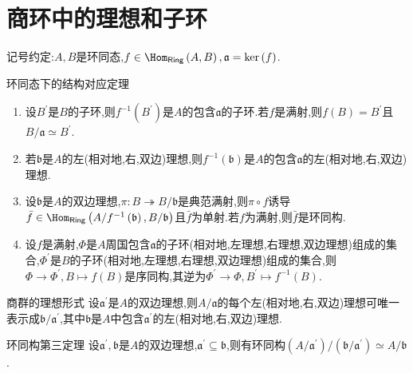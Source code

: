 \section{商环中的理想和子环}

记号约定:$A,B$是环同态,$f\in\Hom_{\mathsf{Ring}}\left(A,B\right),\mathfrak{a}=\ker\left(f\right)$.

\begin{proposition}{环同态下的结构对应定理}{}
	\begin{enumerate}
		\item 设$B^{\prime}$是$B$的子环,则$f^{-1}\left(B^{\prime}\right)$是$A$的包含$\mathfrak{a}$的子环.若$f$是满射,则$f\left(B\right)=B^{\prime}$且$B/\mathfrak{a}\simeq B^{\prime}$.
		\item 若$\mathfrak{b}$是$A$的左(相对地,右,双边)理想,则$f^{-1}\left(\mathfrak{b}\right)$是$A$的包含$\mathfrak{a}$的左(相对地,右,双边)理想.
		\item 设$\mathfrak{b}$是$A$的双边理想,$\pi:B\twoheadrightarrow B/\mathfrak{b}$是典范满射,则$\pi\circ f$诱导$\bar{f}\in\Hom_{\mathsf{Ring}}\left(A/f^{-1}\left(\mathfrak{b}\right),B/\mathfrak{b}\right)$且$\bar{f}$为单射.若$f$为满射,则$\bar{f}$是环同构.
		\item 设$f$是满射,$\Phi$是$A$周国包含$\mathfrak{a}$的子环(相对地,左理想,右理想,双边理想)组成的集合,$\Phi^{\prime}$是$B$的子环(相对地,左理想,右理想,双边理想)组成的集合,则$\Phi\to\Phi^{\prime},B\mapsto f\left(B\right)$是序同构,其逆为$\Phi^{\prime}\to\Phi,B^{\prime}\mapsto f^{-1}\left(B\right)$.
	\end{enumerate}
\end{proposition}

\begin{corollary}{商群的理想形式}{}
	设$\mathfrak{a}^{\prime}$是$A$的双边理想,则$A/\mathfrak{a}$的每个左(相对地,右,双边)理想可唯一表示成$\mathfrak{b}/\mathfrak{a}^{\prime}$,其中$\mathfrak{b}$是$A$中包含$\mathfrak{a}^{\prime}$的左(相对地,右,双边)理想.
\end{corollary}

\begin{corollary}{环同构第三定理}{}
	设$\mathfrak{a}^{\prime},\mathfrak{b}$是$A$的双边理想,$\mathfrak{a}^{\prime}\subseteq\mathfrak{b}$,则有环同构$\left(A/\mathfrak{a}^{\prime}\right)/\left(\mathfrak{b}/\mathfrak{a}^{\prime}\right)\simeq A/\mathfrak{b}$.
\end{corollary}
